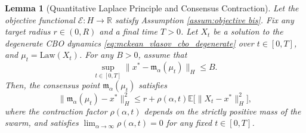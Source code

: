 \documentclass[12pt]{amsart}
\numberwithin{equation}{section}
\newtheorem{lemma}[theorem]{Lemma}
\begin{document}
\begin{lemma}[Quantitative Laplace Principle and Consensus Contraction] \label{lem:laplace_contraction_degenerate}
Let the objective functional $\mathscr{E}: H \to \mathbb{R}$ satisfy Assumption \ref{assum:objective bis}. 
Fix any target radius $r \in (0, R)$ and a final time $T > 0$. Let $X_t$ be a solution to the degenerate CBO dynamics \eqref{eq:mckean_vlasov_cbo_degenerate} over $t \in [0,T]$, and $\mu_t = \mathrm{Law}(X_t)$. 
For any $B > 0$, assume that 
\[
\sup_{t \in [0,T]} \|x^* - \mathfrak{m}_{\alpha}(\mu_t)\|_H \leq B.
\]
Then, the consensus point $\mathfrak{m}_{\alpha}(\mu_t)$ satisfies 
\begin{equation} \label{eq:laplace_bound_statement}
    \|\mathfrak{m}_{\alpha}(\mu_t) - x^*\|_H^2 \leq r + \rho(\alpha, t) \mathbb{E}\big[\|X_t - x^*\|_H^2\big],
\end{equation}
where the contraction factor $\rho(\alpha, t)$ depends on the strictly positive mass of the swarm, and satisfies $\lim_{\alpha \to \infty} \rho(\alpha, t) = 0$ for any fixed $t \in [0,T]$.
\end{lemma}
\end{document}
